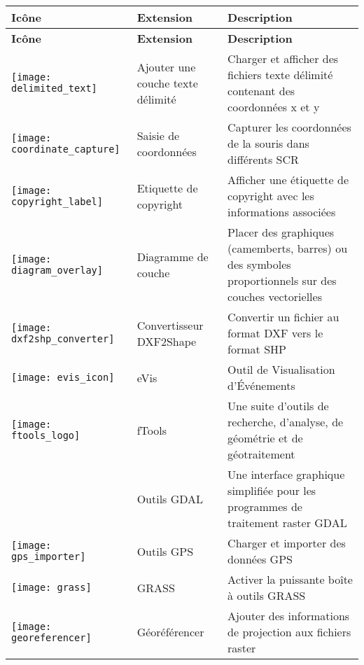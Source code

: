 {\setlength{\extrarowheight}{15pt}
\small
\begin{longtable}{|p{1cm}|p{4cm}|p{8cm}|}
\hline \textbf{Icône} & \textbf{Extension} & \textbf{Description} \\
\endfirsthead
\hline \textbf{Icône} & \textbf{Extension} & \textbf{Description} \\
\endhead
\hline 
\texttt{[image: delimited\_text]}
 & Ajouter une couche texte délimité \index{extensions!texte delimite} & Charger et afficher des fichiers texte délimité contenant des coordonnées x et y\\
\hline
\texttt{[image: coordinate\_capture]}
 & Saisie de coordonnées \index{extensions!saisie de coordonnees} & Capturer les coordonnées de la souris dans différents SCR\\
\hline 
\texttt{[image: copyright\_label]}
 & Etiquette de copyright \index{extensions!copyright} & Afficher une étiquette de copyright avec les informations associées\\
\hline
\texttt{[image: diagram\_overlay]}
 & Diagramme de couche \index{extensions!diagram} & Placer des graphiques (camemberts, barres) ou des symboles proportionnels sur des couches vectorielles\\
\hline
\texttt{[image: dxf2shp\_converter]}
 & Convertisseur DXF2Shape \index{extensions!DXF2Shape} & Convertir un fichier au format DXF vers le format SHP\\
\hline
\texttt{[image: evis\_icon]}
 & eVis & Outil de Visualisation d'Événements\\
\hline
\texttt{[image: ftools\_logo]}
 & fTools \index{extensions!ftools} & Une suite d'outils de recherche, d'analyse, de géométrie et de géotraitement\\
\hline
 & Outils GDAL \index{extensions!gdaltools} & Une interface graphique simplifiée pour les programmes de traitement raster GDAL\\
\hline
\texttt{[image: gps\_importer]}
 & Outils GPS \index{extensions!gps} & Charger et importer des données GPS\\
\hline
\texttt{[image: grass]}
 & GRASS \index{plugin!\grass!boîte à outils} & Activer la puissante boîte à outils GRASS\\
\hline
\texttt{[image: georeferencer]}
 & Géoréférencer \index{plugin!géoréférencement} & Ajouter des informations de projection aux fichiers raster\\

\end{longtable}}
